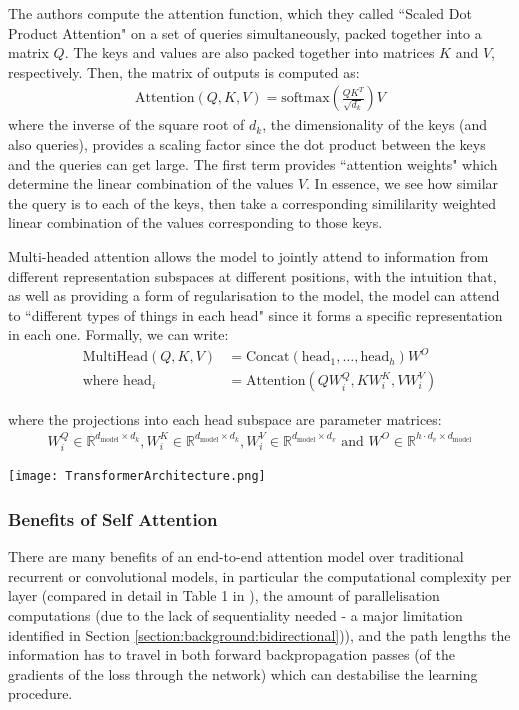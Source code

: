 {{The authors compute the attention function, which they called ``Scaled Dot Product Attention" on a set of queries simultaneously, packed together into a matrix $Q$. The keys and values are also packed together into matrices $K$ and $V$, respectively. Then, the matrix of outputs is computed as:
\begin{align*}
\text{Attention}(Q, K, V) = \text{softmax}\left( \frac{QK^T}{\sqrt{d_k}} \right) V
\end{align*}
where the inverse of the square root of $d_k$, the dimensionality of the keys (and also queries), provides a scaling factor since the dot product between the keys and the queries can get large. The first term provides ``attention weights" which determine the linear combination of the values $V$. In essence, we see how similar the query is to each of the keys, then take a corresponding simililarity weighted linear combination of the values corresponding to those keys.

Multi-headed attention allows the model to jointly attend to information from different representation subspaces at different positions, with the intuition that, as well as providing a form of regularisation to the model, the model can attend to ``different types of things in each head" since it forms a specific representation in each one. Formally, we can write:
\begin{align*}
\text{MultiHead}(Q,K, V) &= \text{Concat}(\text{head}_1, \dots, \text{head}_h) W^O \\
\text{where head}_i &= \text{Attention}(Q W_i^Q ,K W_i^K , V W_i^V )
\end{align*}

where the projections into each head subspace are parameter matrices:
\begin{align*}
W_i^Q \in \mathbb{R}^{d_\text{model} \times d_k} , W_i^K \in \mathbb{R}^{d_\text{model} \times d_k} , W_i^V \in \mathbb{R}^{d_\text{model} \times d_v} \text{ and } W^O \in \mathbb{R}^{h\cdot d_v \times d_\text{model}}
\end{align*}

\begin{center}
	\texttt{[image: TransformerArchitecture.png]}
	\label{fig:background:transformer}
\end{center}

\subsubsection{Benefits of Self Attention}
There are many benefits of an end-to-end attention model over traditional recurrent or convolutional models, in particular the computational complexity per layer (compared in detail in Table 1 in \cite{Vaswani}), the amount of parallelisation computations (due to the lack of sequentiality needed - a major limitation identified in Section \ref{section:background:bidirectional})), and the path lengths the information has to travel in both forward backpropagation passes (of the gradients of the loss through the network) which can destabilise the learning procedure.

}}
